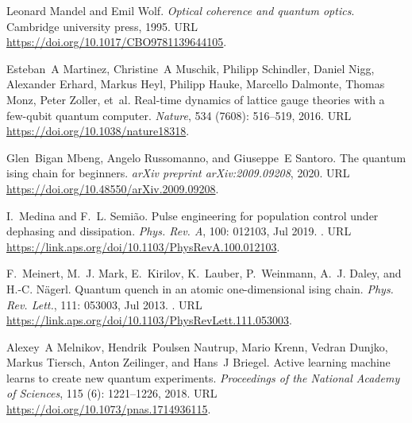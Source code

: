 \documentclass[a4paper,aps,amsmath,amssymb,twocolumn,longbibliography,,accepted=2022-05-17]{quantumarticle}
\begin{document}
\begin{thebibliography}{52}
Leonard Mandel and Emil Wolf.
\newblock \emph{Optical coherence and quantum optics}.
\newblock Cambridge university press, 1995.
\newblock URL \url{https://doi.org/10.1017/CBO9781139644105}.

Esteban~A Martinez, Christine~A Muschik, Philipp Schindler, Daniel Nigg,
  Alexander Erhard, Markus Heyl, Philipp Hauke, Marcello Dalmonte, Thomas Monz,
  Peter Zoller, et~al.
\newblock Real-time dynamics of lattice gauge theories with a few-qubit quantum
  computer.
\newblock \emph{Nature}, 534 (7608): 516--519, 2016.
\newblock URL \url{https://doi.org/10.1038/nature18318}.

Glen~Bigan Mbeng, Angelo Russomanno, and Giuseppe~E Santoro.
\newblock The quantum ising chain for beginners.
\newblock \emph{arXiv preprint arXiv:2009.09208}, 2020.
\newblock URL \url{https://doi.org/10.48550/arXiv.2009.09208}.

I.~Medina and F.~L. Semi\~ao.
\newblock Pulse engineering for population control under dephasing and
  dissipation.
\newblock \emph{Phys. Rev. A}, 100: 012103, Jul 2019.
\newblock {}.
\newblock URL \url{https://link.aps.org/doi/10.1103/PhysRevA.100.012103}.

F.~Meinert, M.~J. Mark, E.~Kirilov, K.~Lauber, P.~Weinmann, A.~J. Daley, and
  H.-C. N\"agerl.
\newblock Quantum quench in an atomic one-dimensional ising chain.
\newblock \emph{Phys. Rev. Lett.}, 111: 053003, Jul 2013.
\newblock {}.
\newblock URL \url{https://link.aps.org/doi/10.1103/PhysRevLett.111.053003}.

Alexey~A Melnikov, Hendrik~Poulsen Nautrup, Mario Krenn, Vedran Dunjko, Markus
  Tiersch, Anton Zeilinger, and Hans~J Briegel.
\newblock Active learning machine learns to create new quantum experiments.
\newblock \emph{Proceedings of the National Academy of Sciences}, 115
  (6): 1221--1226, 2018.
\newblock URL \url{https://doi.org/10.1073/pnas.1714936115}.


\end{thebibliography}
\end{document}
